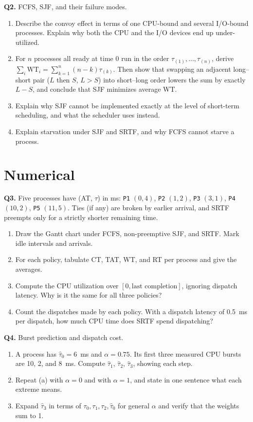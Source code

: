 \documentclass[11pt]{article}
\begin{document}
\textbf{Q2.} FCFS, SJF, and their failure modes.
\begin{enumerate}
  \item[(a)] Describe the convoy effect in terms of one CPU-bound and several I/O-bound processes. Explain why both the CPU and the I/O devices end up under-utilized.
  \item[(b)] For $n$ processes all ready at time 0 run in the order $\tau_{(1)}, \ldots, \tau_{(n)}$, derive $\sum_i \mathrm{WT}_i = \sum_{k=1}^{n}(n-k)\tau_{(k)}$. Then show that swapping an adjacent long--short pair ($L$ then $S$, $L > S$) into short--long order lowers the sum by exactly $L - S$, and conclude that SJF minimizes average WT.
  \item[(c)] Explain why SJF cannot be implemented exactly at the level of short-term scheduling, and what the scheduler uses instead.
  \item[(d)] Explain starvation under SJF and SRTF, and why FCFS cannot starve a process.
\end{enumerate}

\section{Numerical}

\textbf{Q3.} Five processes have (AT, $\tau$) in ms: \texttt{P1} $(0,4)$, \texttt{P2} $(1,2)$, \texttt{P3} $(3,1)$, \texttt{P4} $(10,2)$, \texttt{P5} $(11,5)$. Ties (if any) are broken by earlier arrival, and SRTF preempts only for a strictly shorter remaining time.
\begin{enumerate}
  \item[(a)] Draw the Gantt chart under FCFS, non-preemptive SJF, and SRTF. Mark idle intervals and arrivals.
  \item[(b)] For each policy, tabulate CT, TAT, WT, and RT per process and give the averages.
  \item[(c)] Compute the CPU utilization over $[0, \text{last completion}]$, ignoring dispatch latency. Why is it the same for all three policies?
  \item[(d)] Count the dispatches made by each policy. With a dispatch latency of 0.5~ms per dispatch, how much CPU time does SRTF spend dispatching?
\end{enumerate}

\textbf{Q4.} Burst prediction and dispatch cost.
\begin{enumerate}
  \item[(a)] A process has $\hat{\tau}_0 = 6$~ms and $\alpha = 0.75$. Its first three measured CPU bursts are 10, 2, and 8~ms. Compute $\hat{\tau}_1$, $\hat{\tau}_2$, $\hat{\tau}_3$, showing each step.
  \item[(b)] Repeat (a) with $\alpha = 0$ and with $\alpha = 1$, and state in one sentence what each extreme means.
  \item[(c)] Expand $\hat{\tau}_3$ in terms of $\tau_0, \tau_1, \tau_2, \hat{\tau}_0$ for general $\alpha$ and verify that the weights sum to 1.
\end{enumerate}
\end{document}
